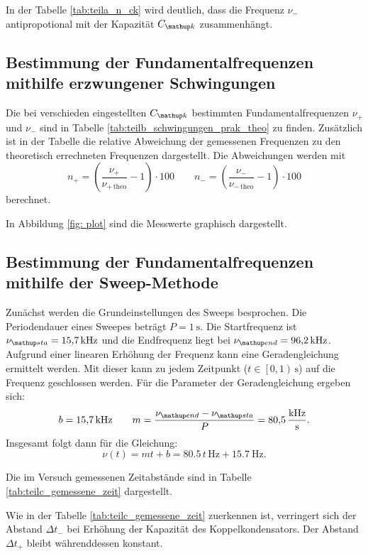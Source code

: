 %


In der Tabelle \ref{tab:teila_n_ck} wird deutlich, dass die Frequenz $\nu_-$ antipropotional
mit der Kapazität $C\ua{k}$ zusammenhängt.

\subsection{Bestimmung der Fundamentalfrequenzen mithilfe erzwungener Schwingungen}
Die bei verschieden eingestellten $C\ua{k}$ bestimmten Fundamentalfrequenzen
$\nu_+$ und $\nu_-$
sind in Tabelle \ref{tab:teilb_schwingungen_prak_theo} zu finden.
Zusätzlich ist in der Tabelle die relative Abweichung der gemessenen Frequenzen
zu den theoretisch errechneten Frequenzen dargestellt.
Die Abweichungen werden mit
\begin{equation}
\label{eq:verh}
n_+=\left(\frac{\nu_+}{\nu_{+\,\mathup{theo}}}-1\right)\cdot 100 \qquad n_-=\left(\frac{\nu_-}{\nu_{-\,\mathup{theo}}}-1\right)\cdot100
\end{equation}
berechnet.
\FloatBarrier

\FloatBarrier
In Abbildung \ref{fig: plot} sind die Messwerte graphisch dargestellt. %

\subsection{Bestimmung der Fundamentalfrequenzen mithilfe der Sweep-Methode}
Zunächst werden die Grundeinstellungen des Sweeps besprochen.
Die Periodendauer eines Sweepes beträgt $P=\SI{1}{\second}$.
Die Startfrequenz ist $\nu\ua{sta}=\SI{15.7}{\kilo\hertz}$ und die
Endfrequenz liegt bei $\nu\ua{end}=\SI{96.2}{\kilo\hertz}$.
Aufgrund einer linearen Erhöhung der Frequenz kann eine Geradengleichung ermittelt werden.
Mit dieser kann zu jedem Zeitpunkt ($t\in\left[0,1\right)\,\si{\second}$) auf die Frequenz geschlossen werden.
Für die Parameter der Geradengleichung ergeben sich:
\begin{equation*}
b=\SI{15.7}{\kilo\hertz} \qquad m=\frac{\nu\ua{end}-\nu\ua{sta}}{P}=\SI{80.5}{\kilo\hertz\per\second}.
\end{equation*}
Insgesamt folgt dann für die Gleichung: %
\begin{equation}
\label{eq:geraden}
\nu(t)=mt+b=80.5\,t\,\si{\hertz}+\SI{15.7}{\hertz}.
\end{equation}

Die im Versuch gemessenen Zeitabstände sind in Tabelle \ref{tab:teilc_gemessene_zeit} dargestellt.

Wie in der Tabelle \ref{tab:teilc_gemessene_zeit} zuerkennen ist, verringert sich der Abstand $\Delta t_-$ bei
Erhöhung der Kapazität des Koppelkondensators. Der Abstand $\Delta t_+$ bleibt währenddessen konstant.

